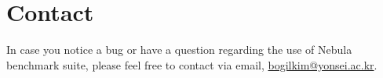 \documentclass[10pt]{article}
\begin{document}
%
%
\section{Contact} \label{sec:contact}
In case you notice a bug or have a question regarding the use of Nebula benchmark suite, please feel free to contact via email, \href{mailto:bogilkim@yonsei.ac.kr}{bogilkim@yonsei.ac.kr}.
% 
\end{document}
